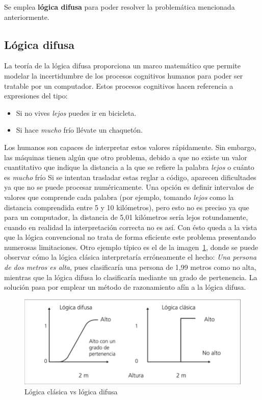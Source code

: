 Se emplea \textbf{lógica difusa} para poder resolver la problemática mencionada anteriormente.
\subsection{Lógica difusa}
La teoría de la lógica difusa proporciona un marco matemático que permite modelar la incertidumbre de los procesos cognitivos humanos para poder ser tratable por un computador. Estos procesos cognitivos hacen referencia a expresiones del tipo:
\begin{itemize}
	\item Si no vives \textit{lejos} puedes ir en bicicleta.
	\item Si hace \textit{mucho} frío llévate un chaquetón.
\end{itemize}
Los humanos son capaces de interpretar estos valores rápidamente. Sin embargo, las máquinas tienen algún que otro problema, debido a que no existe un valor cuantitativo que indique la distancia a la que se refiere la palabra \textit{lejos} o cuánto es \textit{mucho} frío Si se intentan trasladar estas reglar a código, aparecen dificultades ya que no se puede procesar numéricamente. Una opción es definir intervalos de valores que comprende cada palabra (por ejemplo, tomando \textit{lejos} como la distancia comprendida entre 5 y 10 kilómetros), pero esto no es preciso ya que para un computador, la distancia de 5,01 kilómetros sería lejos rotundamente, cuando en realidad la interpretación correcta no es así. Con ésto queda a la vista que la lógica convencional no trata de forma eficiente este problema presentando numerosas limitaciones. Otro ejemplo típico es el de la imagen~\ref{fig:ejemplo_logica}, donde se puede observar cómo la lógica clásica interpretaría erróneamente el hecho: \textit{Una persona de dos metros es alta}, pues clasificaría una persona de 1,99 metros como no alta, mientras que la lógica difusa lo clasificaría mediante un grado de pertenencia. La solución pasa por emplear un método de razonamiento afín a la lógica difusa.\\
\begin{figure}[!h]
	\centering
	\includegraphics[width=13cm]{figs/tipos_logica.png}
	\caption{Lógica clásica vs lógica difusa}
        \label{fig:ejemplo_logica}
\end{figure}

